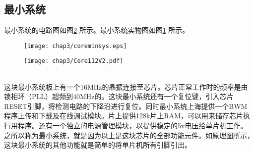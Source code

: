 \subsection{最小系统}
最小系统的电路图如图\ref{fig.CoreSch} 所示。最小系统实物图如图\ref{fig.CorePhoto} 所示。 \\
\begin{figure}[!htp]\label{fig.CorePhoto}
  \centering
  \texttt{[image: chap3/coreminsys.eps]}
\end{figure}
\begin{figure}[!htp]\label{fig.CoreSch}
  \centering
  \texttt{[image: chap3/Core112V2.pdf]}
\end{figure}
\\
这块最小系统板上有一个16MHz的晶振连接至芯片。芯片正常工作时的频率是由锁相环（PLL）超频到40MHz的。这块最小系统还有一个复位键，引入芯片RESET引脚，将检测电路的下降沿进行复位。同时最小系统上海提供一个BWM程序上传和下载及在线调试模块。片上提供128k片上RAM，可以用来储存芯片执行用程序。还有一个独立的电源管理模块，以提供稳定的5v电压给单片机工作。之所以称为最小系统，就是因为以上是这块芯片的全部功能元件。如原理图所示，这块最小系统的其他功能就是简单的将单片机所有引脚引出。 \\
